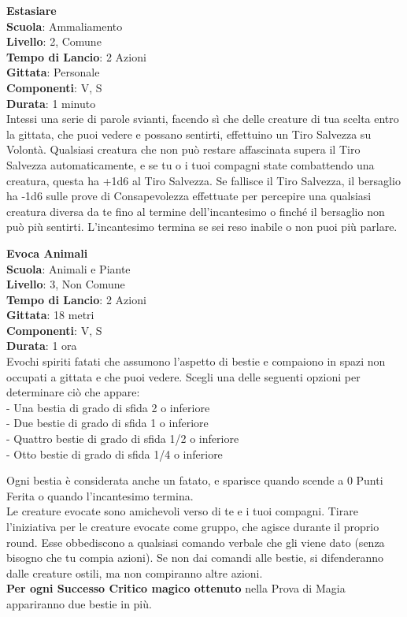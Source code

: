 \begin{multicols}{2}
\medskip\textbf{Estasiare}\\
\textbf{Scuola}: Ammaliamento\\
\textbf{Livello}: 2, Comune\\
\textbf{Tempo di Lancio}: 2 Azioni\\
\textbf{Gittata}: Personale\\
\textbf{Componenti}: V, S\\
\textbf{Durata}: 1 minuto\\
Intessi una serie di parole svianti, facendo sì che delle creature di tua scelta entro la gittata, che puoi vedere e possano sentirti, effettuino un Tiro Salvezza su Volontà. Qualsiasi creatura che non può restare affascinata supera il Tiro Salvezza automaticamente, e se tu o i tuoi compagni state combattendo una creatura, questa ha +1d6 al Tiro Salvezza. Se fallisce il Tiro Salvezza, il bersaglio ha -1d6 sulle prove di Consapevolezza effettuate per percepire una qualsiasi creatura diversa da te fino al termine dell'incantesimo o finché il bersaglio non può più sentirti.
L'incantesimo termina se sei reso inabile o non puoi più parlare.

\medskip\textbf{Evoca Animali}\\
\textbf{Scuola}: Animali e Piante\\
\textbf{Livello}: 3, Non Comune\\
\textbf{Tempo di Lancio}: 2 Azioni\\
\textbf{Gittata}: 18 metri\\
\textbf{Componenti}: V, S\\
\textbf{Durata}: 1 ora\\
Evochi spiriti fatati che assumono l'aspetto di bestie e compaiono in spazi non occupati a gittata e che puoi vedere. Scegli una delle seguenti opzioni per determinare ciò che appare:\\

- Una bestia di grado di sfida 2 o inferiore\\
- Due bestie di grado di sfida 1 o inferiore\\
- Quattro bestie di grado di sfida 1/2 o inferiore\\
- Otto bestie di grado di sfida 1/4 o inferiore\\
\medskip

Ogni bestia è considerata anche un fatato, e sparisce quando scende a 0 Punti Ferita o quando l'incantesimo termina. \\
Le creature evocate sono amichevoli verso di te e i tuoi compagni. Tirare l'iniziativa per le creature evocate come gruppo, che agisce durante il proprio round. Esse obbediscono a qualsiasi comando verbale che gli viene dato (senza bisogno che tu compia azioni). Se non dai comandi alle bestie, si difenderanno dalle creature ostili, ma non compiranno altre azioni.\\
\textbf{Per ogni Successo Critico magico ottenuto} nella Prova di Magia appariranno due bestie in più.


\end{multicols}
